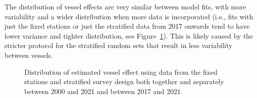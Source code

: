 \documentclass[12pt]{article}\usepackage[]{graphicx}\usepackage[]{color}
\begin{document}
The distribution of vessel effects are very similar between model fits, with more variability and a wider distribution when more data is incorporated (i.e., fits with just the fixed stations or just the stratified data from 2017 onwards tend to have lower variance and tighter distribution, see Figure~\ref{fig:vess-eff}). This is likely caused by the stricter protocol for the stratified random sets that result in less variability between vessels.
\begin{figure}[htb]

{\centering {}  

}

\caption{Distribution of estimated vessel effect using data from the fixed stations and stratified survey design both together and separately between 2000 and 2021 and between 2017 and 2021.}\label{fig:vess-eff}
\end{figure}
\end{document}
